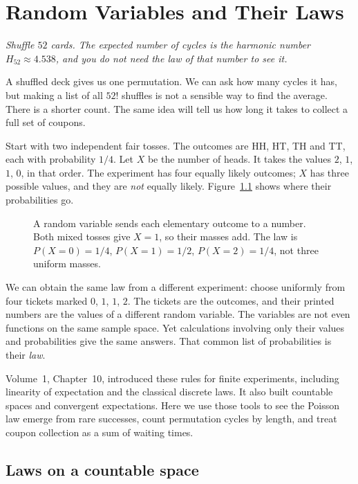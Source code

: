 \chapter{Random Variables and Their Laws}

\begin{center}\itshape
Shuffle $52$ cards. The expected number of cycles is the harmonic number\\
$H_{52}\approx4.538$, and you do not need the law of that number to see it.
\end{center}

A shuffled deck gives us one permutation. We can ask how many cycles it has, but making a list of all $52!$ shuffles is not a sensible way to find the average. There is a shorter count. The same idea will tell us how long it takes to collect a full set of coupons.

Start with two independent fair tosses. The outcomes are HH, HT, TH and TT, each with probability $1/4$. Let $X$ be the number of heads. It takes the values $2$, $1$, $1$, $0$, in that order. The experiment has four equally likely outcomes; $X$ has three possible values, and they are \emph{not} equally likely. Figure~\ref{fig:lawmap} shows where their probabilities go.

\begin{figure}[ht]
\centering
{}
\caption{A random variable sends each elementary outcome to a number. Both mixed tosses give $X=1$, so their masses add. The law is $P(X=0)=1/4$, $P(X=1)=1/2$, $P(X=2)=1/4$, not three uniform masses.}
\label{fig:lawmap}
\end{figure}

We can obtain the same law from a different experiment: choose uniformly from four tickets marked $0$, $1$, $1$, $2$. The tickets are the outcomes, and their printed numbers are the values of a different random variable. The variables are not even functions on the same sample space. Yet calculations involving only their values and probabilities give the same answers. That common list of probabilities is their \emph{law}.

Volume~1, Chapter~10, introduced these rules for finite experiments, including linearity of expectation and the classical discrete laws. It also built countable spaces and convergent expectations. Here we use those tools to see the Poisson law emerge from rare successes, count permutation cycles by length, and treat coupon collection as a sum of waiting times.

\section{Laws on a countable space}

